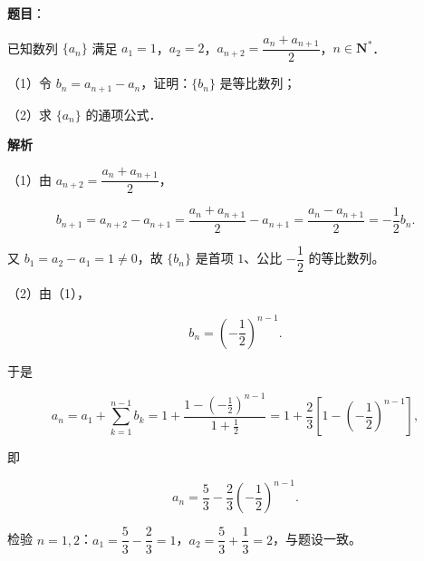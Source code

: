 \begin{answer}

\textbf{题目}：

已知数列 $\{a_n\}$ 满足 $a_1=1$，$a_2=2$，$a_{n+2}=\dfrac{a_n+a_{n+1}}2$，$n\in\mathbf N^*$．

（1）令 $b_n=a_{n+1}-a_n$，证明：$\{b_n\}$ 是等比数列；

（2）求 $\{a_n\}$ 的通项公式．

\textbf{解析}

（1）由 $a_{n+2}=\dfrac{a_n+a_{n+1}}2$，

\nopagebreak[4]
\[b_{n+1}=a_{n+2}-a_{n+1}
=\frac{a_n+a_{n+1}}2-a_{n+1}
=\frac{a_n-a_{n+1}}2=-\frac12b_n.\]

又 $b_1=a_2-a_1=1\neq0$，故 $\{b_n\}$ 是首项 $1$、公比 $-\dfrac12$ 的等比数列。

（2）由（1），

\nopagebreak[4]
\[b_n=\left(-\frac12\right)^{n-1}.\]

于是

\nopagebreak[4]
\[a_n=a_1+\sum_{k=1}^{n-1}b_k
=1+\frac{1-\left(-\frac12\right)^{n-1}}{1+\frac12}
=1+\frac23\left[1-\left(-\frac12\right)^{n-1}\right],\]

即

\nopagebreak[4]
\[a_n=\frac53-\frac23\left(-\frac12\right)^{n-1}.\]

检验 $n=1,2$：$a_1=\dfrac53-\dfrac23=1$，$a_2=\dfrac53+\dfrac13=2$，与题设一致。


\end{answer}
